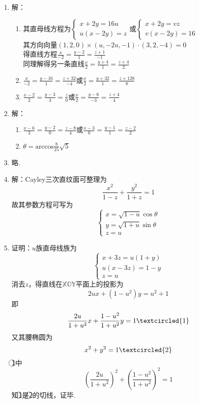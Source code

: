 \documentclass[UTF8]{ctexart}
\begin{document}
\begin{enumerate}
\item 解：\begin{enumerate}[(1)]
\item 其直母线方程为$\left\{\begin{array}{l}x+2y=16u\\u\left(x-2y\right)=z\end{array}\right.$或$\left\{\begin{array}{l}x+2y=vz\\v\left(x-2y\right)=16\end{array}\right.$\\
其方向向量$\left(1,2,0\right)\times\left(u,-2u,-1\right)\cdot\left(3,2,-4\right)=0$\\
得直线方程$\displaystyle\frac{x}{-2}=\displaystyle\frac{y-2}{1}=\displaystyle\frac{z+1}{-1}$\\
同理解得另一条直线$\displaystyle\frac{x}{2}=\displaystyle\frac{y+4}{1}=\displaystyle\frac{z+4}{2}$\\
\item $\displaystyle\frac{x}{-2}=\displaystyle\frac{y-16}{1}=\displaystyle\frac{z+32}{-4}$或$\displaystyle\frac{x}{2}=\displaystyle\frac{y+32}{1}=\displaystyle\frac{z+128}{8}$
\item $\displaystyle\frac{x-2}{2}=\displaystyle\frac{y-3}{3}=\displaystyle\frac{z}{0}$或$\displaystyle\frac{x}{2}=\displaystyle\frac{y-6}{-3}=\displaystyle\frac{z+4}{4}$
\end{enumerate}
\item 解：\begin{enumerate}[(1)]
\item $\displaystyle\frac{x-6}{3}=\displaystyle\frac{y-2}{0}=\displaystyle\frac{z-8}{4}$或$\displaystyle\frac{x-3}{0}=\displaystyle\frac{y-1}{1}=\displaystyle\frac{z-2}{2}$
\item $\theta=\mathrm{arccos}\displaystyle\frac{8}{25}\sqrt{5}$
\end{enumerate}

\item 略.

\item 解：Cayley三次直纹面可整理为$$\frac{x^2}{1-z}+\frac{y^2}{1+z}=1$$故其参数方程可写为$$\left\{\begin{array}{l}x=\sqrt{1-u}\cos\theta\\y=\sqrt{1+u}\sin\theta\\z=u\end{array}\right.$$

\item 证明：$u$族直母线族为$$\left\{\begin{array}{l}x+3z=u\left(1+y\right)\\u\left(x-3z\right)=1-y\\z=u\end{array}\right.$$消去$z$，得直线在$\mathbb{X}\mathbb{O}\mathbb{Y}$平面上的投影为
$$2ux+\left(1-u^2\right)y=u^2+1$$
即$$\displaystyle\frac{2u}{1+u^2}x+\displaystyle\frac{1-u^2}{1+u^2}y=1\textcircled{1}$$
又其腰椭圆为$$x^2+y^2=1\textcircled{2}$$
\textcircled{1}中$$\left(\displaystyle\frac{2u}{1+u^2}\right)^2+\left(\displaystyle\frac{1-u^2}{1+u^2}\right)^2=1$$
知\textcircled{1}是\textcircled{2}的切线，证毕.
\end{enumerate}
\end{document}
